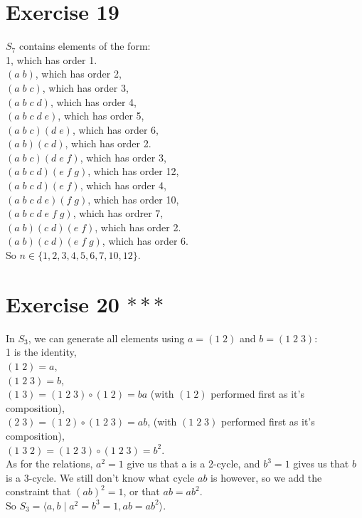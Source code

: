 \documentclass[12pt]{article}
\begin{document}
    \section*{Exercise 19}
    $S_7$ contains elements of the form: \\ 
    1, which has order 1. \\
    $(a\;b)$, which has order 2, \\
    $(a\;b\;c)$, which has order 3, \\
    $(a\;b\;c\;d)$, which has order 4, \\
    $(a\;b\;c\;d\;e)$, which has order 5, \\
    $(a\;b\;c)(d\;e)$, which has order 6, \\
    $(a\;b)(c\;d)$, which has order 2. \\
    $(a\;b\;c)(d\;e\;f)$, which has order 3, \\
    $(a\;b\;c\;d)(e\;f\;g)$, which has order 12, \\
    $(a\;b\;c\;d)(e\;f)$, which has order 4, \\
    $(a\;b\;c\;d\;e)(f\;g)$, which has order 10, \\
    $(a\;b\;c\;d\;e\;f\;g)$, which has ordrer 7, \\
    $(a\;b)(c\;d)(e\;f)$, which has order 2. \\
    $(a\;b)(c\;d)(e\;f\;g)$, which has order 6. \\
    So $n \in \{ 1, 2, 3, 4, 5, 6, 7, 10, 12 \}$.
    

    \section*{Exercise 20 $***$}
    In $S_3$, we can generate all elements using $a = (1\;2)$
    and $b = (1\;2\;3)$: \\
    1 is the identity, \\
    $(1\;2) = a$, \\
    $(1\;2\;3) = b$, \\
    $(1\;3) = (1\;2\;3) \circ (1\;2) = ba$
    (with $(1\;2)$ performed first as it's composition), \\
    $(2\;3) = (1\;2) \circ (1\;2\;3) = ab$,
    (with $(1\;2\;3)$ performed first as it's composition), \\
    $(1\;3\;2) = (1\;2\;3) \circ (1\;2\;3) = b^2$. \\
    As for the relations, $a^2 = 1$ give us that a is a 2-cycle,
    and $b^3 = 1$ gives us that $b$ is a 3-cycle.
    We still don't know what cycle $ab$ is however, so we add the
    constraint that $(ab)^2 = 1$, or that $ab = ab^2$. \\
    So $S_3 = \langle a, b \mid a^2 = b^3 =1, ab = ab^2 \rangle$.

    
\end{document}
